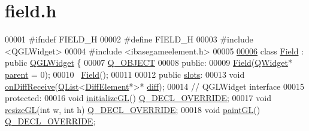 \hypertarget{a00074_source}{}\section{field.\+h}
\label{a00074_source}

\begin{DoxyCode}
00001 \textcolor{preprocessor}{#}\textcolor{preprocessor}{ifndef} \textcolor{preprocessor}{FIELD\_H}
00002 \textcolor{preprocessor}{#}\textcolor{preprocessor}{define} \textcolor{preprocessor}{FIELD\_H}
00003 \textcolor{preprocessor}{#}\textcolor{preprocessor}{include} \textcolor{preprocessor}{<}\textcolor{preprocessor}{QGLWidget}\textcolor{preprocessor}{>}
00004 \textcolor{preprocessor}{#}\textcolor{preprocessor}{include} \textcolor{preprocessor}{<}\textcolor{preprocessor}{ibasegameelement}\textcolor{preprocessor}{.}\textcolor{preprocessor}{h}\textcolor{preprocessor}{>}
00005 
\hyperlink{a00173}{00006} \textcolor{keyword}{class} \hyperlink{a00173_a407d6701413d3627ef50e9e86786b987}{Field} : \textcolor{keyword}{public} \hyperlink{a00173_a407d6701413d3627ef50e9e86786b987}{QGLWidget} \{
00007   \hyperlink{a00173_a407d6701413d3627ef50e9e86786b987}{Q\_OBJECT}
00008  \textcolor{keyword}{public}:
00009   \hyperlink{a00173_a407d6701413d3627ef50e9e86786b987}{Field}(\hyperlink{a00173_a407d6701413d3627ef50e9e86786b987}{QWidget}* \hyperlink{a00173_a407d6701413d3627ef50e9e86786b987}{parent} = 0);
00010   ~\hyperlink{a00173_a45d6e6d09b8f8e46de62b40119d62c60}{Field}();
00011 
00012  \textcolor{keyword}{public} \hyperlink{a00173_a407d6701413d3627ef50e9e86786b987}{slots}:
00013   \textcolor{keywordtype}{void} \hyperlink{a00173_a407d6701413d3627ef50e9e86786b987}{onDiffReceive}(\hyperlink{a00173_a407d6701413d3627ef50e9e86786b987}{QList}<\hyperlink{a00173_a407d6701413d3627ef50e9e86786b987}{DiffElement}*>* \hyperlink{a00173_a407d6701413d3627ef50e9e86786b987}{diff});
00014   \textcolor{comment}{// QGLWidget interface}
00015  \textcolor{keyword}{protected}:
00016   \textcolor{keywordtype}{void} \hyperlink{a00173_a38484502a93b5cd191d8ababc415e0cb}{initializeGL}() \hyperlink{a00173_a407d6701413d3627ef50e9e86786b987}{Q\_DECL\_OVERRIDE};
00017   \textcolor{keywordtype}{void} \hyperlink{a00173_a4122f1e70a73ec6c580029d968e4553c}{resizeGL}(\textcolor{keywordtype}{int} w, \textcolor{keywordtype}{int} h) \hyperlink{a00173_a407d6701413d3627ef50e9e86786b987}{Q\_DECL\_OVERRIDE};
00018   \textcolor{keywordtype}{void} \hyperlink{a00173_a43d725e582133d23bcbebdcd7bd4a287}{paintGL}() \hyperlink{a00173_a407d6701413d3627ef50e9e86786b987}{Q\_DECL\_OVERRIDE};

\end{DoxyCode}
